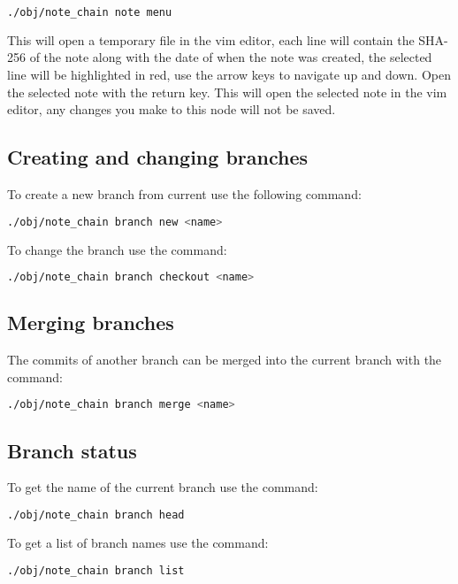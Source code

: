\documentclass[12pt,a4paper]{article}
\begin{document}
\begin{lstlisting}[language=bash]
  ./obj/note_chain note menu
\end{lstlisting}

\noindent
This will open a temporary file in the vim editor, each line will contain the
SHA-256 of the note along with the date of when the note was created, the
selected line will be highlighted in red, use the arrow keys to navigate up and
down. Open the selected note with the return key. This will open the selected
note in the vim editor, any changes you make to this node will not be saved.

\subsection{Creating and changing branches}
To create a new branch from current use the following command:

\begin{lstlisting}[language=bash]
  ./obj/note_chain branch new <name>
\end{lstlisting}

\noindent
To change the branch use the command:

\begin{lstlisting}[language=bash]
  ./obj/note_chain branch checkout <name>
\end{lstlisting}


\subsection{Merging branches}
The commits of another branch can be merged into the current branch with the command:

\begin{lstlisting}[language=bash]
  ./obj/note_chain branch merge <name>
\end{lstlisting}

\subsection{Branch status}
To get the name of the current branch use the command:

\begin{lstlisting}[language=bash]
  ./obj/note_chain branch head
\end{lstlisting}

\noindent
To get a list of branch names use the command:

\begin{lstlisting}[language=bash]
  ./obj/note_chain branch list
\end{lstlisting}
\end{document}
